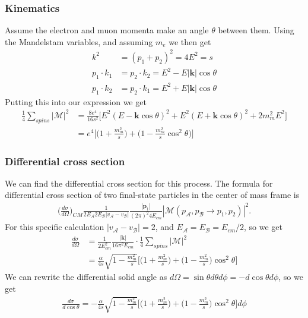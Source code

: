 \documentclass[11pt]{article}
\begin{document}
\subsubsection{Kinematics}
\begin{flushleft}
Assume the electron and muon momenta make an angle $\theta$ between them. Using the Mandelstam variables, and assuming $m_e$ we then get
\begin{align*}
k^2 &= (p_1 + p_2)^2 = 4E^2 = s\\
p_1 \cdot k_1 &= p_2 \cdot k_2 = E^2 - E|\textbf{k}| \cos \theta\\
p_1 \cdot k_2 &= p_2 \cdot k_1 = E^2 + E|\textbf{k}| \cos \theta
\end{align*}
Putting this into our expression we get
\begin{align*}
\frac{1}{4} \sum_{spins} |\mathcal{M}|^2 &= \frac{8e^4}{16s^2} \Big[E^2(E -\textbf{k} \cos \theta)^2 + E^2 (E +\textbf{k} \cos \theta)^2 + 2m_m^2 E^2 \Big]\\
&= e^4 \Big[ \Big(1 + \frac{m_m^2}{s} \Big) + \Big(1 - \frac{m_m^2}{s} \cos^2 \theta \Big) \Big]
\end{align*}
\end{flushleft}

\subsubsection{Differential cross section}
\begin{flushleft}
We can find the differential cross section for this process. The formula for differential cross section of two final-state particles in the center of mass frame is
\begin{align*}
\Big( \frac{d \sigma}{d \Omega} \Big)_{CM} \frac{1}{2E_{\mathcal{A}}2 E_{\mathcal{B}} |v_{\mathcal{A}}-v_{\mathcal{B}}|} \frac{|\textbf{p}_1|}{(2 \pi)^2 4 E_{cm}}|\mathcal{M}(p_{\mathcal{A}}, p_{\mathcal{B}} \rightarrow p_1, p_2)|^2.
\end{align*}
For this specific calculation $|v_{\mathcal{A}}-v_{\mathcal{B}}|=2$, and $E_{\mathcal{A}}=E_{\mathcal{B}}= E_{cm}/2$, so we get
\begin{align*}
\frac{d \sigma}{d \Omega} &= \frac{1}{2 E_{cm}^2} \frac{|\textbf{k}|}{16 \pi^2 E_{cm}} \cdot \frac{1}{4} \sum_{spins} |\mathcal{M}|^2\\
&= \frac{\alpha}{4 s} \sqrt{1 - \frac{m_m^2}{s}} \Big[ \Big( 1 + \frac{m_m^2}{s}\Big) + \Big( 1 - \frac{m_m^2}{s}\Big) \cos^2 \theta \Big]
\end{align*}
We can rewrite the differential solid angle as $d \Omega = \sin \theta d \theta d \phi = - d \cos \theta d \phi$, so we get
\begin{align*}
\frac{d \sigma}{d \cos \theta} = - \frac{\alpha}{4 s} \sqrt{1 - \frac{m_m^2}{s}} \Big[ \Big( 1 + \frac{m_m^2}{s}\Big) + \Big( 1 - \frac{m_m^2}{s}\Big) \cos^2 \theta \Big] d \phi
\end{align*}
\end{flushleft}
\end{document}
